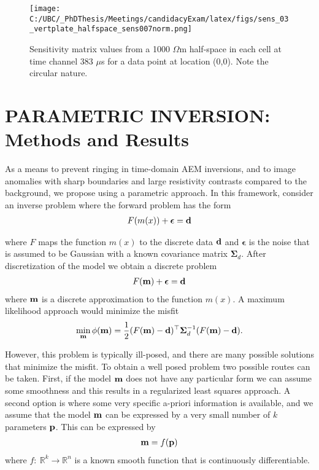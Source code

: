 \documentclass[letterpaper,11pt]{article}
\newcommand{\bfm}{{\bf m}}
\newcommand{\bfd}{{\bf d}}
\newcommand{\bfp}{{\bf p}}
\newcommand{\hf}{\frac 12}
\newcommand{\bfepsilon}{{\boldsymbol \epsilon}}
\newcommand{\bfSigma}{{\boldsymbol \Sigma}}
\begin{document}
\begin{figure}[h]
\centering
\texttt{[image: C:/UBC/\_PhDThesis/Meetings/candidacyExam/latex/figs/sens\_03\_vertplate\_halfspace\_sens007norm.png]}
\caption{Sensitivity matrix values from a 1000 $ \Omega $m half-space in each cell at time channel 383 $ \mu $s for a data point at location (0,0). Note the circular nature.}
\label{fig:SynthVertPlateSens}
\end{figure}

\clearpage



\section{PARAMETRIC INVERSION: Methods and Results}
As a means to prevent ringing in time-domain AEM inversions, and to image anomalies with sharp boundaries and large resistivity contrasts compared to the background, we propose using a parametric approach. In this framework, consider an inverse problem where the forward problem has the form
\begin{eqnarray}
\label{forpro}
F(m(x)) +\bfepsilon = \bfd
\end{eqnarray}

where $F$ maps the function $m(x)$ to the discrete data $\bfd$ and $\bfepsilon$ is the noise that is
assumed to be Gaussian with a known covariance matrix $\bfSigma_{d}$.
After discretization of the model we obtain a discrete problem
\begin{eqnarray}
\label{forprod}
F(\bfm) +\bfepsilon = \bfd
\end{eqnarray}
where $\bfm$ is a discrete approximation to the function $m(x)$.
A maximum likelihood approach would minimize the misfit
\begin{eqnarray}
\min_{\bfm} \phi(\bfm) =  \hf (F(\bfm) - \bfd)^{\top}\bfSigma_{d}^{-1}(F(\bfm) - \bfd).
\end{eqnarray}

However, this problem is typically ill-posed, and there are many possible solutions that minimize
the misfit. To obtain a well posed problem two possible routes can be taken.
First, if the model $\bfm$ does not have any particular form we can assume some smoothness
and this results in a regularized least squares approach.
A second option is where some very specific a-priori information is available, and
we assume that the model $\bfm$ can be expressed by a very small number of $k$ parameters $\bfp$. This can be expressed by
\begin{eqnarray}
\label{modfun}
\bfm = f(\bfp) 
\end{eqnarray}
where $f: \ \mathbb{R}^{k} \rightarrow \mathbb{R}^{n}$ is a known smooth function that is continuously differentiable. 
\end{document}
